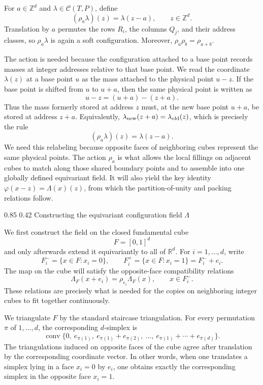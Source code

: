 \documentclass[11pt,reqno]{amsart}
\makeatletter
\numberwithin{equation}{section}
\renewcommand\subsection{\@startsection{subsection}{2}{\z@}%
  {0.85\baselineskip \@plus 0.25\baselineskip \@minus 0.10\baselineskip}%
  {0.42\baselineskip}%
  {\normalfont\bfseries}}
\theoremstyle{definition}
\theoremstyle{remark}
\newcommand{\R}{\mathbb R}
\newcommand{\Z}{\mathbb Z}
\makeatother
\begin{document}
For $a\in\Z^d$ and $\lambda\in\mathcal C(T,P)$, define
\begin{equation}\label{eq:rho-action}
 (\rho_a\lambda)(z)=\lambda(z-a),
 \qquad z\in\Z^d.
\end{equation}
Translation by $a$ permutes the rows $R_i$, the columns $Q_j$, and their
address classes, so $\rho_a\lambda$ is again a soft configuration.  Moreover,
$\rho_a\rho_b=\rho_{a+b}$.

The action is needed because the configuration attached to a base point
records masses at integer addresses relative to that base point.  We read
the coordinate $\lambda(z)$ at a base point $u$ as the mass attached to the
physical point $u-z$.  If the base point is shifted from $u$ to $u+a$, then
the same physical point is written as
\[
 u-z=(u+a)-(z+a).
\]
Thus the mass formerly stored at address $z$ must, at the new base point
$u+a$, be stored at address $z+a$.  Equivalently,
$\lambda_{\rm new}(z+a)=\lambda_{\rm old}(z)$, which is precisely the rule
\[
 (\rho_a\lambda)(z)=\lambda(z-a).
\]
We need this relabeling because opposite faces of neighboring cubes represent
the same physical points.  The action $\rho_a$ is what allows the local
fillings on adjacent cubes to match along those shared boundary points and to
assemble into one globally defined equivariant field.  It will also yield the
key identity $\varphi(x-z)=\Lambda(x)(z)$, from which the
partition-of-unity and packing relations follow.

\subsection{Constructing the equivariant configuration field $\Lambda$}

We first construct the field on the closed fundamental cube
\[
 F=[0,1]^d
\]
and only afterwards extend it equivariantly to all of $\R^d$.  For
$i=1,\ldots,d$, write
\[
 F_i^- =\{x\in F:x_i=0\},
 \qquad
 F_i^+ =\{x\in F:x_i=1\}=F_i^-+e_i.
\]
The map on the cube will satisfy the opposite-face compatibility relations
\begin{equation}\label{eq:cube-face-compatibility}
 \Lambda_F(x+e_i)=\rho_{e_i}\Lambda_F(x),
 \qquad x\in F_i^-.
\end{equation}
These relations are precisely what is needed for the copies on neighboring
integer cubes to fit together continuously.

We triangulate $F$ by the standard staircase triangulation.  For every
permutation $\pi$ of $1,\ldots,d$, the corresponding $d$-simplex is
\begin{equation}\label{eq:staircase-simplex}
 \operatorname{conv}\bigl\{0,\ e_{\pi(1)},\
 e_{\pi(1)}+e_{\pi(2)},\ \ldots,\
 e_{\pi(1)}+\cdots+e_{\pi(d)}\bigr\}.
\end{equation}
The triangulations induced on opposite faces of the cube agree after
translation by the corresponding coordinate vector.  In other words, when one
translates a simplex lying in a face $x_i=0$ by $e_i$, one obtains exactly the
corresponding simplex in the opposite face $x_i=1$.
\end{document}
